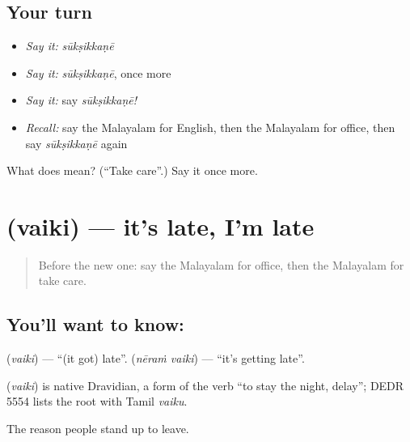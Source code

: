 \subsection*{Your turn}
\begin{itemize}
\raggedright
  \item \emph{Say it:} \emph{sūkṣikkaṇē}
  \item \emph{Say it:} \emph{sūkṣikkaṇē}, once more
  \item \emph{Say it:} say \emph{sūkṣikkaṇē!}
  \item \emph{Recall:} say the Malayalam for English, then the Malayalam for office, then say \emph{sūkṣikkaṇē} again
\end{itemize}

\begin{tcolorbox}[breakable,colback=teal!4,colframe=teal!35!black,title={Before you move on}]
What does  mean? (\textquotedblleft{}Take care\textquotedblright{}.) Say it once more.
\end{tcolorbox}
\section[\texorpdfstring{\ml{വൈകി} (vaiki)}{വൈകി (vaiki)}]{ (vaiki) — it's late, I'm late}

\label{lesson:ML-C127-late}



\begin{quote}
Before the new one: say the Malayalam for office, then the Malayalam for take care.
\end{quote}

\subsection*{You'll want to know: }
\textbf{} (\emph{vaiki}) — \textquotedblleft{}(it got) late\textquotedblright{}. \textbf{ } (\emph{nēraṁ vaiki}) — \textquotedblleft{}it's getting late\textquotedblright{}.

\begin{cousinweb}
\textbf{} (\emph{vaiki}) is native Dravidian, a form of the verb \textquotedblleft{}to stay the night, delay\textquotedblright{}; DEDR 5554 lists the root with Tamil \emph{vaiku}.
\end{cousinweb}

\begin{grammarlens}[title={What you've built}]
The reason people stand up to leave.
\end{grammarlens}

